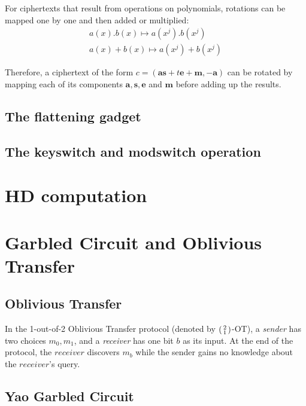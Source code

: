\begin{description}
  For ciphertexts that result from operations on polynomials, rotations can be mapped one by one and then added or multiplied:
\begin{align*}
  a(x).b(x) \mapsto a(x^{j}).b(x^{j})\\
  a(x) + b(x) \mapsto a(x^{j}) + b(x^{j})
\end{align*}

Therefore, a ciphertext of the form
\(c = (\mathbf{as} + t \mathbf{e} + \mathbf{m}, -\mathbf{a})\) can be rotated by
 mapping each of its components \(\mathbf{a},\mathbf{s},\mathbf{e}\)
and \(\mathbf{m}\) before adding up the results.
\end{description}

\subsection{The flattening gadget}
\label{sec:6flattening}

\subsection{The keyswitch and modswitch operation}
\label{sec:6keyswitch}

\section{HD computation}
\label{sec:6hdcomp}

\section{Garbled Circuit and Oblivious Transfer}
\label{sec:6garbled}

\subsection{Oblivious Transfer}
In the 1-out-of-2 Oblivious Transfer protocol (denoted by
\(\begin{psmallmatrix} 2 \\ 1 \end{psmallmatrix} \)-OT), a \textit{sender} has
two choices \(m_{0}, m_{1}\), and a \textit{receiver} has one bit \(b\) as its
input. At the end of the protocol, the \(receiver\) discovers \(m_{b}\) while the
sender gains no knowledge  about the \(receiver\)'s query.

\subsection{Yao Garbled Circuit}
\label{sec:yao-garbled-circuit}

